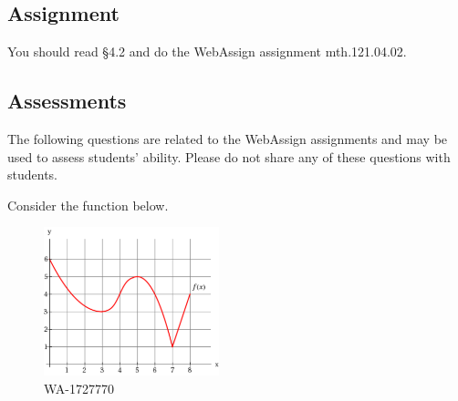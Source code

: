 \documentclass[12pt,addpoints, answers, fleqn]{exam}
\begin{document}
\subsection{Assignment}
You should read \S  4.2 and do the WebAssign assignment mth.121.04.02.
\vfill
\pagebreak
\begin{teacher}
\subsection{Assessments}
The following questions are related to the WebAssign assignments and may be used to assess students' ability. Please do not share any of these questions with students.
\begin{questions}	
\question 	%

Consider the function below.

\begin{figure}[htbp] %
   \centering
   \includegraphics[width=2in]{./graphics/1727770.pdf} 
   \caption{WA-1727770}
   \label{fig:1727770}
\end{figure}

\end{questions}
\end{teacher}
\end{document}
